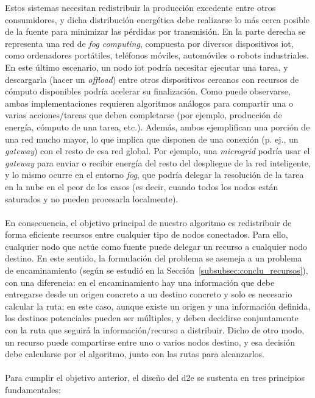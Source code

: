 Estos sistemas necesitan redistribuir la producción excedente entre otros consumidores, y dicha distribución energética debe realizarse lo más cerca posible de la fuente para minimizar las pérdidas por transmisión. En la parte derecha se representa una red de \textit{fog computing}, compuesta por diversos dispositivos \gls{iot}, como ordenadores portátiles, teléfonos móviles, automóviles o robots industriales. En este último escenario, un nodo \gls{iot} podría necesitar ejecutar una tarea, y descargarla (hacer un \textit{offload}) entre otros dispositivos cercanos con recursos de cómputo disponibles podría acelerar su finalización. Como puede observarse, ambas implementaciones requieren algoritmos análogos para compartir una o varias acciones/tareas que deben completarse (por ejemplo, producción de energía, cómputo de una tarea, etc.). Además, ambos ejemplifican una porción de una red mucho mayor, lo que implica que disponen de una conexión (p. ej., un \textit{gateway}) con el resto de esa red global. Por ejemplo, una \textit{microgrid} podría usar el \textit{gateway} para enviar o recibir energía del resto del despliegue de la red inteligente, y lo mismo ocurre en el entorno \textit{fog}, que podría delegar la resolución de la tarea en la nube en el peor de los casos (es decir, cuando todos los nodos están saturados y no pueden procesarla localmente).\\
\\
En consecuencia, el objetivo principal de nuestro algoritmo es redistribuir de forma eficiente recursos entre cualquier tipo de nodos conectados. Para ello, cualquier nodo que actúe como fuente puede delegar un recurso a cualquier nodo destino. En este sentido, la formulación del problema se asemeja a un problema de encaminamiento (según se estudió en la Sección~\ref{subsubsec:conclu_recursos}), con una diferencia: en el encaminamiento hay una información que debe entregarse desde un origen concreto a un destino concreto y solo es necesario calcular la ruta; en este caso, aunque existe un origen y una información definida, los destinos potenciales pueden ser múltiples, y deben decidirse conjuntamente con la ruta que seguirá la información/recurso a distribuir. Dicho de otro modo, un recurso puede compartirse entre uno o varios nodos destino, y esa decisión debe calcularse por el algoritmo, junto con las rutas para alcanzarlos.\\
\\
Para cumplir el objetivo anterior, el diseño del \gls{d2e} se sustenta en tres principios fundamentales:

